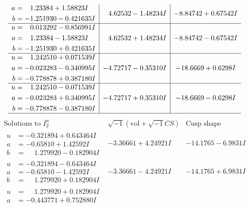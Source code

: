 \documentclass[1p]{elsarticle_modified}
\theoremstyle{definition}
\newcommand{\I}{\sqrt{-1}}
\begin{document}
$$\begin{array}{c|c|c}
\begin{aligned}
a &= \phantom{-}1.23384 + 1.58823 I \\
b &= -1.251930 - 0.421635 I\end{aligned}
 & \phantom{-}4.62532 - 1.48234 I & -8.84742 + 0.67542 I \\ \hline\begin{aligned}
u &= \phantom{-}0.013292 - 0.856991 I \\
a &= \phantom{-}1.23384 - 1.58823 I \\
b &= -1.251930 + 0.421635 I\end{aligned}
 & \phantom{-}4.62532 + 1.48234 I & -8.84742 - 0.67542 I \\ \hline\begin{aligned}
u &= \phantom{-}1.242510 + 0.071539 I \\
a &= -0.023283 - 0.340995 I \\
b &= -0.778878 + 0.387180 I\end{aligned}
 & -4.72717 - 0.35310 I & -18.6669 + 0.6298 I \\ \hline\begin{aligned}
u &= \phantom{-}1.242510 - 0.071539 I \\
a &= -0.023283 + 0.340995 I \\
b &= -0.778878 - 0.387180 I\end{aligned}
 & -4.72717 + 0.35310 I & -18.6669 - 0.6298 I\\
 \hline 
 \end{array}$$\newpage$$\begin{array}{c|c|c}  
\text{Solutions to }I^u_{2}& \I (\text{vol} + \sqrt{-1}CS) & \text{Cusp shape}\\
 \hline 
\begin{aligned}
u &= -0.321894 + 0.643464 I \\
a &= -0.65810 + 1.42592 I \\
b &= \phantom{-}1.279920 - 0.182904 I\end{aligned}
 & -3.36661 + 4.24921 I & -14.1765 - 6.9831 I \\ \hline\begin{aligned}
u &= -0.321894 - 0.643464 I \\
a &= -0.65810 - 1.42592 I \\
b &= \phantom{-}1.279920 + 0.182904 I\end{aligned}
 & -3.36661 - 4.24921 I & -14.1765 + 6.9831 I \\ \hline\begin{aligned}
u &= \phantom{-}1.279920 + 0.182904 I \\
a &= -0.443771 + 0.752880 I \\

\end{aligned}
\end{array}$$
\end{document}
